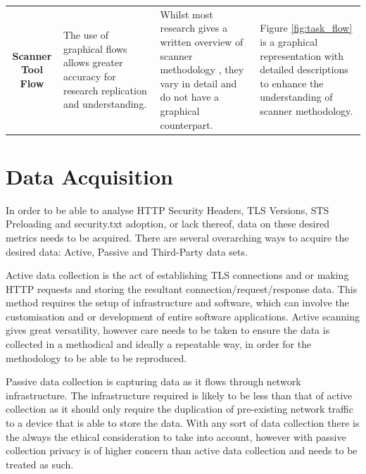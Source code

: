 \documentclass{mscreport}
\begin{document}
\begin{center}
\begin{longtable}{|C|E|H|H|}
      \hline
      \textbf{Scanner Tool Flow} & The use of graphical flows allows greater accuracy for research replication and understanding. & Whilst most research gives a written overview of scanner methodology \cite{Buchanan2018-xz,Amann2017-co,Patil2017-bg,Kotzias2018-wd,Poteat2021-zr,Van_Goethem2014-ao,Chen2016-dl,Kumar2017-qw,Holz2020-ha,Michael2015-hn}, they vary in detail and do not have a graphical counterpart. & Figure \ref{fig:task_flow} is a graphical representation with detailed descriptions to enhance the understanding of scanner methodology. \\
\end{longtable}
\end{center}

\newpage

\section{Data Acquisition}
\label{section:data_aquisition}

In order to be able to analyse HTTP Security Headers, TLS Versions, STS Preloading and security.txt adoption, or lack thereof, data on these desired metrics needs to be acquired. There are several overarching ways to acquire the desired data: Active, Passive and Third-Party data sets.

\vspace{0.3cm} \noindent
Active data collection is the act of establishing TLS connections and or making HTTP requests and storing the resultant connection/request/response data. This method requires the setup of infrastructure and software, which can involve the customisation and or development of entire software applications. Active scanning gives great versatility, however care needs to be taken to ensure the data is collected in a methodical and ideally a repeatable way, in order for the methodology to be able to be reproduced.

\vspace{0.3cm} \noindent
Passive data collection is capturing data as it flows through network infrastructure. The infrastructure required is likely to be less than that of active collection as it should only require the duplication of pre-existing network traffic to a device that is able to store the data. With any sort of data collection there is the always the ethical consideration to take into account, however with passive collection privacy is of higher concern than active data collection and needs to be treated as such.
\end{document}
